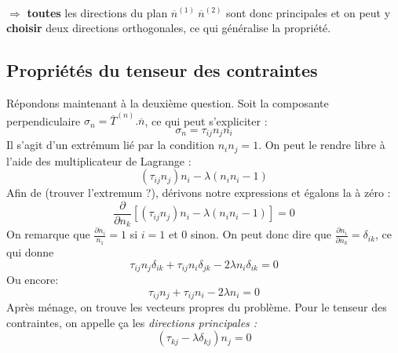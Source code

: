 \ \\
$\Rightarrow$ \textbf{toutes} les directions du plan $\overline{n}^{(1)}\ \overline{n}^{(2)}$ sont donc
principales et on peut y \textbf{choisir} deux directions orthogonales, ce qui généralise la propriété.
    
    
\subsection{Propriétés du tenseur des contraintes}
Répondons maintenant à la deuxième question. Soit la composante perpendiculaire $\sigma_n 
= \overline{T}^{(n)}.\overline{n}$, ce qui peut s'expliciter :
\begin{equation}
	\sigma_n = \tau_{ij}n_jn_i
\end{equation}
Il s'agit d'un extrémum lié par la condition $n_in_j=1$. On peut le rendre libre à l'aide des 
multiplicateur de Lagrange :
\begin{equation}
	(\tau_{ij}n_j)n_i - \lambda (n_in_i - 1)
\end{equation}
Afin de (trouver l'extremum ?), dérivons notre expressions et égalons la à zéro :
\begin{equation}
	\frac{\partial}{\partial n_k}[(\tau_{ij}n_j)n_i - \lambda (n_in_i - 1)] = 0
\end{equation}
On remarque que $\frac{\partial n_i}{n_1} = 1$ si $i=1$ et 0 sinon. On peut donc dire que 
$\frac{\partial n_i}{\partial n_k} = \delta_{ik}$, ce qui donne 
\begin{equation}
	\tau_{ij}n_j\delta_{ik} + \tau_{ij}n_i \delta_{jk} - 2\lambda n_i \delta_{ik} = 0
\end{equation}
Ou encore:
\begin{equation}
	\tau_{ij}n_j + \tau_{ij}n_i - 2\lambda n_i  = 0
\end{equation}
Après ménage, on trouve les vecteurs propres du problème. Pour le tenseur des contraintes, on appelle
ça les \textit{directions principales :}
\begin{equation}
	(\tau_{kj} - \lambda\delta_{kj})n_j = 0
\end{equation}
    
